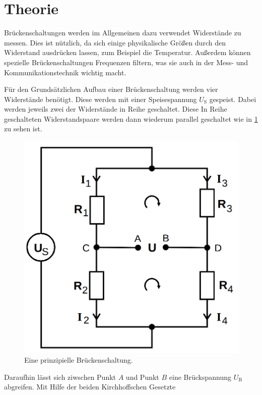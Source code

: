 \section{Theorie}
\label{sec:Theorie}

Brückenschaltungen werden im Allgemeinen dazu verwendet Widerstände zu messen.
Dies ist nützlich, da sich einige physikalische Größen durch den Widerstand ausdrücken lassen, zum Beispiel die Temperatur.
Außerdem können spezielle Brückenschaltungen Frequenzen filtern, was sie auch in der Mess- und Kommunikationstechnik wichtig macht.

Für den Grundsätzlichen Aufbau einer Brückenschaltung werden vier Widerstände benötigt.
Diese werden mit einer Speisespannung $U_\text{S}$ gespeist. Dabei werden jeweils zwei der Widerstände in Reihe geschaltet.
Diese In Reihe geschalteten Widerstandspaare werden dann wiederum parallel geschaltet wie in \ref{fig:brueckprinzip} zu sehen ist.

\begin{figure}
    \centering
    \includegraphics[scale=0.25]{content/Brueckenschaltung.png}
    \caption{Eine prinzipielle Brückenschaltung. \cite[S. 216]{anleitung}}
    \label{fig:brueckprinzip}
\end{figure}

Daraufhin lässt sich ziwschen Punkt $A$ und Punkt $B$ eine Brückspannung $U_\text{B}$ abgreifen.
Mit Hilfe der beiden Kirchhoffschen Gesetzte

